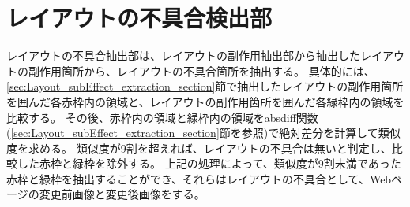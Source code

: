 \section{レイアウトの不具合検出部}\label{sec:Layout_bug_extraction_section}
レイアウトの不具合抽出部は、レイアウトの副作用抽出部から抽出したレイアウトの副作用箇所から、レイアウトの不具合箇所を抽出する。
具体的には、\ref{sec:Layout_subEffect_extraction_section}節で抽出したレイアウトの副作用箇所を囲んだ各赤枠内の領域と、レイアウトの副作用箇所を囲んだ各緑枠内の領域を比較する。
その後、赤枠内の領域と緑枠内の領域をabsdiff関数(\ref{sec:Layout_subEffect_extraction_section}節を参照)で絶対差分を計算して類似度を求める。
類似度が9割を超えれば、レイアウトの不具合は無いと判定し、比較した赤枠と緑枠を除外する。
上記の処理によって、類似度が9割未満であった赤枠と緑枠を抽出することができ、それらはレイアウトの不具合として、Webページの変更前画像と変更後画像をする。









